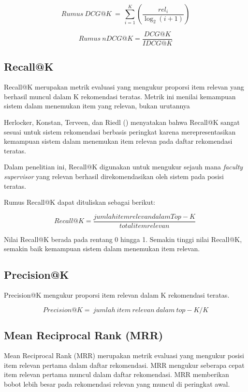 \[Rumus\ DCG@K\  = \ \sum_{i=1}^{K} \left(\frac{rel_i}{\log_2(i + 1)}\right)\]

\[Rumus\ nDCG@K = \frac{DCG@K}{IDCG@K}\]

\subsection{Recall@K}\label{recallk}

Recall@K merupakan metrik evaluasi yang mengukur proporsi item relevan yang berhasil muncul dalam K rekomendasi teratas. Metrik ini menilai kemampuan sistem dalam menemukan item yang relevan, bukan urutannya

Herlocker, Konstan, Terveen, dan Riedl (\citeyear{herlocker2004recall}) menyatakan bahwa Recall@K sangat sesuai untuk sistem rekomendasi berbasis peringkat karena merepresentasikan kemampuan sistem dalam menemukan item relevan pada daftar rekomendasi teratas.

Dalam penelitian ini, Recall@K digunakan untuk mengukur sejauh mana \textit{faculty supervisor} yang relevan berhasil direkomendasikan oleh sistem pada posisi teratas.

Rumus Recall@K dapat dituliskan sebagai berikut:

\[Recall@K = \frac{jumlahitemrelevandalamTop - K}{totalitemrelevan}\ \]

Nilai Recall@K berada pada rentang 0 hingga 1. Semakin tinggi nilai Recall@K, semakin baik kemampuan sistem dalam menemukan item relevan.

\subsection{Precision@K}\label{precisionk}

Precision@K mengukur proporsi item relevan dalam K rekomendasi teratas.

\[Precision@K = \ jumlah\ item\ relevan\ dalam\ top - K/K\]

\subsection{Mean Reciprocal Rank (MRR)}\label{mean-reciprocal-rank-mrr}

Mean Reciprocal Rank (MRR) merupakan metrik evaluasi yang mengukur posisi item relevan pertama dalam daftar rekomendasi. MRR mengukur seberapa cepat item relevan pertama muncul dalam daftar rekomendasi. MRR memberikan bobot lebih besar pada rekomendasi relevan yang muncul di peringkat awal.

